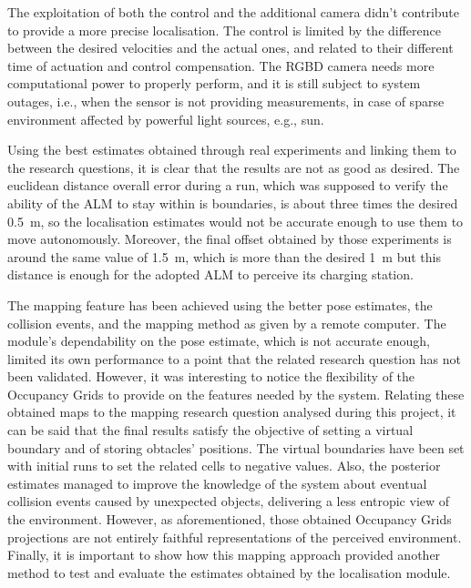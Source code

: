 The exploitation of both the control and the additional camera didn't contribute to provide a more precise localisation.
The control is limited by the difference between the desired velocities and the actual ones, and related to their different time of actuation and control compensation.
The \gls{RGBD} camera needs more computational power to properly perform, and it is still subject to system outages, i.e., when the sensor is not providing measurements, in case of sparse environment affected by powerful light sources, e.g., sun. 

Using the best estimates obtained through real experiments and linking them to the research questions, it is clear that the results are not as good as desired.
The euclidean distance overall error during a run, which was supposed to verify the ability of the \gls{ALM} to stay within is boundaries, is about three times the desired \SI{0.5}{m}, so the localisation estimates would not be accurate enough to use them to move autonomously.
Moreover, the final offset obtained by those experiments is around the same value of \SI{1.5}{m}, which is more than the desired \SI{1}{m} but this distance is enough for the adopted \gls{ALM} to perceive its charging station.

The mapping feature has been achieved using the better pose estimates, the collision events, and the mapping method as given by a remote computer.
The module's dependability on the pose estimate, which is not accurate enough, limited its own performance to a point that the related research question has not been validated.
However, it was interesting to notice the flexibility of the Occupancy Grids to provide on the features needed by the system.
Relating these obtained maps to the mapping research question analysed during this project, it can be said that the final results satisfy the objective of setting a virtual boundary and of storing obtacles' positions.
The virtual boundaries have been set with initial runs to set the related cells to negative values.
Also, the posterior estimates managed to improve the knowledge of the system about eventual collision events caused by unexpected objects, delivering a less entropic view of the environment.
However, as aforementioned, those obtained Occupancy Grids projections are not entirely faithful representations of the perceived environment.
Finally, it is important to show how this mapping approach provided another method to test and evaluate the estimates obtained by the localisation module.



